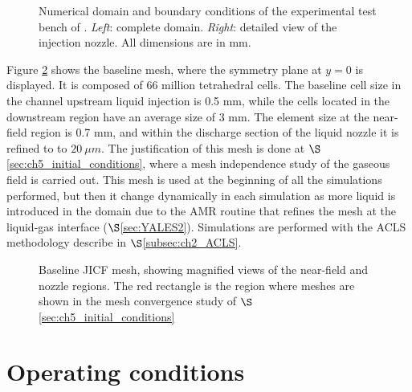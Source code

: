 \begin{figure}[ht]
     \centering
      \caption{Numerical domain and boundary conditions of the experimental test bench of . \textsl{Left}: complete domain. \textsl{Right}: detailed view of the injection nozzle. All dimensions are in mm.}
      \label{fig:numerical_setup_maquette_JICF_DLR}
\end{figure}

Figure \ref{fig:jicf_dlr_mesh} shows the baseline mesh, where the symmetry plane at $y = 0$ is displayed. It is composed of 66 million tetrahedral cells. The baseline cell size in the channel upstream liquid injection is 0.5 mm, while the cells located in the downstream region have an average size of 3 mm. The element size at the near-field region is 0.7 mm, and within the discharge section of the liquid nozzle it is refined to to $20~\mu m$. The justification of this mesh is done at $\S$\ref{sec:ch5_initial_conditions}, where a mesh independence study of the gaseous field is carried out. This mesh is used at the beginning of all the simulations performed, but then it change dynamically in each simulation as more liquid is introduced in the domain due to the AMR routine that refines the mesh at the liquid-gas interface ($\S$\ref{sec:YALES2}). Simulations are performed with the ACLS methodology describe in $\S$\ref{subsec:ch2_ACLS}.

\begin{figure}[h!]
	\centering
	\caption[Baseline JICF mesh, showing magnified views of the near-field and nozzle regions.]{Baseline JICF mesh, showing magnified views of the near-field and nozzle regions. The red rectangle is the region where meshes are shown in the mesh convergence study of $\S$\ref{sec:ch5_initial_conditions}}
	\label{fig:jicf_dlr_mesh}
\end{figure}



\section{Operating conditions}

